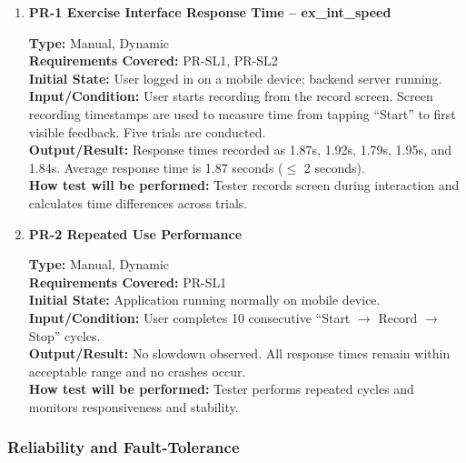 \documentclass[12pt, titlepage]{article}
\begin{document}
\begin{enumerate}

\item \textbf{PR-1 Exercise Interface Response Time -- ex\_int\_speed}

\textbf{Type:} Manual, Dynamic \\
\textbf{Requirements Covered:} PR-SL1, PR-SL2\\
\textbf{Initial State:} User logged in on a mobile device; backend server running. \\
\textbf{Input/Condition:} User starts recording from the record screen. Screen recording timestamps are used to measure time from tapping ``Start'' to first visible feedback. Five trials are conducted. \\
\textbf{Output/Result:} Response times recorded as 1.87s, 1.92s, 1.79s, 1.95s, and 1.84s. Average response time is 1.87 seconds ($\leq$ 2 seconds). \\
\textbf{How test will be performed:} Tester records screen during interaction and calculates time differences across trials. \\

\vspace{0.5em}

\item \textbf{PR-2 Repeated Use Performance}

\textbf{Type:} Manual, Dynamic \\
\textbf{Requirements Covered:} PR-SL1\\
\textbf{Initial State:} Application running normally on mobile device. \\
\textbf{Input/Condition:} User completes 10 consecutive ``Start $\rightarrow$ Record $\rightarrow$ Stop'' cycles. \\
\textbf{Output/Result:} No slowdown observed. All response times remain within acceptable range and no crashes occur. \\
\textbf{How test will be performed:} Tester performs repeated cycles and monitors responsiveness and stability. \\

\end{enumerate}

\subsubsection{Reliability and Fault-Tolerance}
\end{document}
